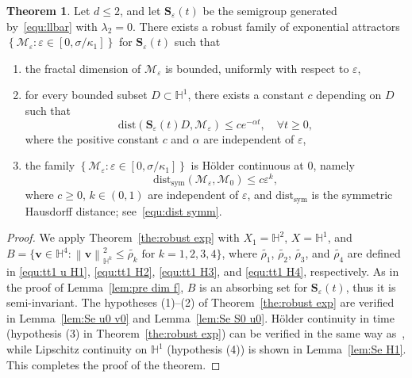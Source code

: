 \documentclass[11pt, reqno]{amsart}
\theoremstyle{definition}
\newtheorem{theorem}{Theorem}[section]
\numberwithin{equation}{section}
\newcommand{\bff}{\boldsymbol}
\newcommand{\bb}{\mathbb}
\newcommand{\norm}[2]{\left\|{#1}\right\|_{#2}}
\begin{document}
\begin{theorem}\label{the:robust exp att}
Let $d\leq 2$, and let $\bff{S}_\varepsilon(t)$ be the semigroup generated by~\eqref{equ:llbar} with $\lambda_2=0$. There exists a robust family of exponential attractors $\left\{\mathcal{M}_\varepsilon: \varepsilon\in [0, \sigma/\kappa_1]\right\}$ for $\bff{S}_\varepsilon(t)$ such that
\begin{enumerate}
    \item the fractal dimension of $\mathcal{M}_\varepsilon$ is bounded, uniformly with respect to $\varepsilon$,
    \item for every bounded subset $D\subset \bb{H}^1$, there exists a constant $c$ depending on $D$ such that
    \[
        \text{dist}\left(\bff{S}_\varepsilon(t)D, \mathcal{M}_\varepsilon\right) \leq c e^{-\alpha t}, \quad \forall t\geq 0,
    \]
    where the positive constant $c$ and $\alpha$ are independent of $\varepsilon$,
    \item the family $\left\{\mathcal{M}_\varepsilon: \varepsilon\in [0, \sigma/\kappa_1]\right\}$ is H\"older continuous at $0$, namely
    \[
        \text{dist}_{\text{sym}} \left(\mathcal{M}_\varepsilon, \mathcal{M}_0\right) \leq c\varepsilon^k,
    \]
    where $c\geq 0$, $k\in (0,1)$ are independent of $\varepsilon$, and $\text{dist}_{\text{sym}}$ is the symmetric Hausdorff distance; see~\eqref{equ:dist symm}.
\end{enumerate}
\end{theorem}

\begin{proof}
We apply Theorem~\ref{the:robust exp} with $X_1=\bb{H}^2$, $X=\bb{H}^1$, and 
$B=\{\bff{v}\in \bb{H}^4: \norm{\bff{v}}{\bb{H}^k}^2 \leq \widetilde{\rho_k} \text{ for } k=1,2,3,4\}$,
where $\widetilde{\rho_1}$, $\widetilde{\rho_2}$, $\widetilde{\rho_3}$, and $\widetilde{\rho_4}$ are defined in \eqref{equ:tt1 u H1}, \eqref{equ:tt1 H2}, \eqref{equ:tt1 H3}, and \eqref{equ:tt1 H4}, respectively. As in the proof of Lemma~\ref{lem:pre dim f}, $B$ is an absorbing set for $\bff{S}_\varepsilon(t)$, thus it is semi-invariant.
The hypotheses (1)--(2) of Theorem~\ref{the:robust exp} are verified in Lemma~\ref{lem:Se u0 v0} and Lemma~\ref{lem:Se S0 u0}. H\"older continuity in time (hypothesis (3) in Theorem~\ref{the:robust exp}) can be verified in the same way as~\cite[Theorem 2.3]{SoeTra23}, while Lipschitz continuity on $\bb{H}^1$ (hypothesis (4)) is shown in Lemma~\ref{lem:Se H1}. This completes the proof of the theorem.
\end{proof}
\end{document}
